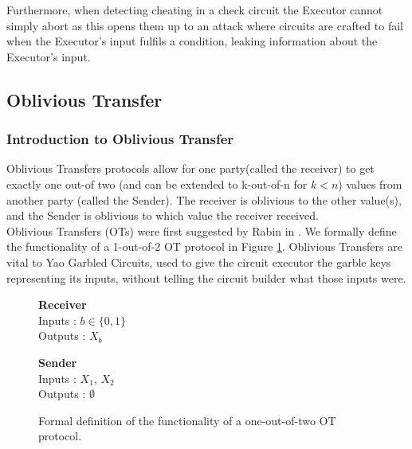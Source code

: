 \documentclass[a4paper,10pt]{article}
\begin{document}
				Furthermore, when detecting cheating in a check circuit the Executor cannot simply abort as this opens them up to an attack where circuits are crafted to fail when the Executor's input fulfils a condition, leaking information about the Executor's input.


		\subsection{Oblivious Transfer} \label{OT_Intro}	
			\subsubsection{Introduction to Oblivious Transfer}
				Oblivious Transfers protocols allow for one party(called the receiver) to get exactly one out-of two (and can be extended to k-out-of-n for $k < n$) values from another party (called the Sender). The receiver is oblivious to the other value(s), and the Sender is oblivious to which value the receiver received.\\

				Oblivious Transfers (OTs) were first suggested by Rabin in \cite{Rabin81}. We formally define the functionality of a 1-out-of-2 OT protocol in Figure \ref{fig:OTformalDef}. Oblivious Transfers are vital to Yao Garbled Circuits, used to give the circuit executor the garble keys representing its inputs, without telling the circuit builder what those inputs were.\\

				\begin{figure}[!htb]
					\centering
					\begin{minipage}{0.45\textwidth}
						\centering
						\textbf{Receiver}\\
						Inputs : $b \in \{0, 1\}$\\
						Outputs : $X_b$\\
					\end{minipage}
					\begin{minipage}{0.45\textwidth}
						\centering
						\textbf{Sender}\\
						Inputs : $X_1$, $X_2$\\
						Outputs : $\emptyset$\\
					\end{minipage}

					\caption{ Formal definition of the functionality of a one-out-of-two OT protocol.\label{fig:OTformalDef}}
				\end{figure}
      
\end{document}

